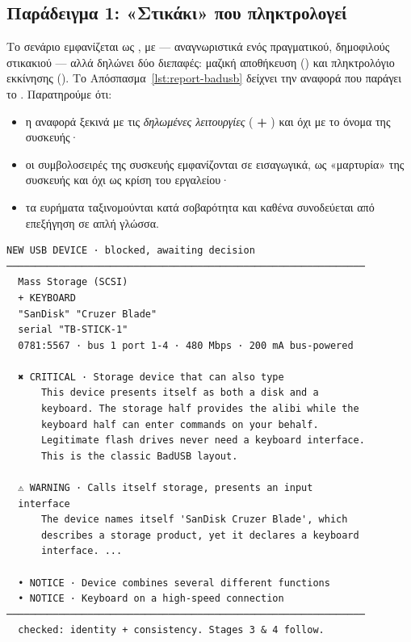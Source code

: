 \subsection{Παράδειγμα 1: «Στικάκι» που πληκτρολογεί}
\label{sec:example-badusb}

Το σενάριο  εμφανίζεται ως , με
  — αναγνωριστικά ενός πραγματικού, δημοφιλούς
στικακιού — αλλά δηλώνει δύο διεπαφές: μαζική αποθήκευση () και
πληκτρολόγιο εκκίνησης (). Το Απόσπασμα~\ref{lst:report-badusb}
δείχνει την αναφορά που παράγει το \Probolos. Παρατηρούμε ότι:

\begin{itemize}
  \item η αναφορά ξεκινά με τις \emph{δηλωμένες λειτουργίες} (
        \textbf{+} ) και όχι με το όνομα της συσκευής·
  \item οι συμβολοσειρές της συσκευής εμφανίζονται σε εισαγωγικά, ως
        «μαρτυρία» της συσκευής και όχι ως κρίση του εργαλείου·
  \item τα ευρήματα ταξινομούνται κατά σοβαρότητα και καθένα συνοδεύεται από
        επεξήγηση σε απλή γλώσσα.
\end{itemize}

\begin{lstlisting}[caption={Αναφορά τερματικού για το σενάριο \code{badusb} (έξοδος της μονάδας \code{report.py}, χωρίς χρώματα).},label=lst:report-badusb]
NEW USB DEVICE · blocked, awaiting decision
──────────────────────────────────────────────────────────────
  Mass Storage (SCSI)
  + KEYBOARD
  "SanDisk" "Cruzer Blade"
  serial "TB-STICK-1"
  0781:5567 · bus 1 port 1-4 · 480 Mbps · 200 mA bus-powered

  ✖ CRITICAL · Storage device that can also type
      This device presents itself as both a disk and a
      keyboard. The storage half provides the alibi while the
      keyboard half can enter commands on your behalf.
      Legitimate flash drives never need a keyboard interface.
      This is the classic BadUSB layout.

  ⚠ WARNING · Calls itself storage, presents an input
  interface
      The device names itself 'SanDisk Cruzer Blade', which
      describes a storage product, yet it declares a keyboard
      interface. ...

  • NOTICE · Device combines several different functions
  • NOTICE · Keyboard on a high-speed connection
──────────────────────────────────────────────────────────────
  checked: identity + consistency. Stages 3 & 4 follow.
\end{lstlisting}


